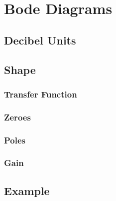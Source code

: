 \section*{Bode Diagrams}
\subsection*{Decibel Units}
\subsection*{Shape}
\subsubsection*{Transfer Function}
\subsubsection*{Zeroes}
\subsubsection*{Poles}
\subsubsection*{Gain}
\subsection*{Example}